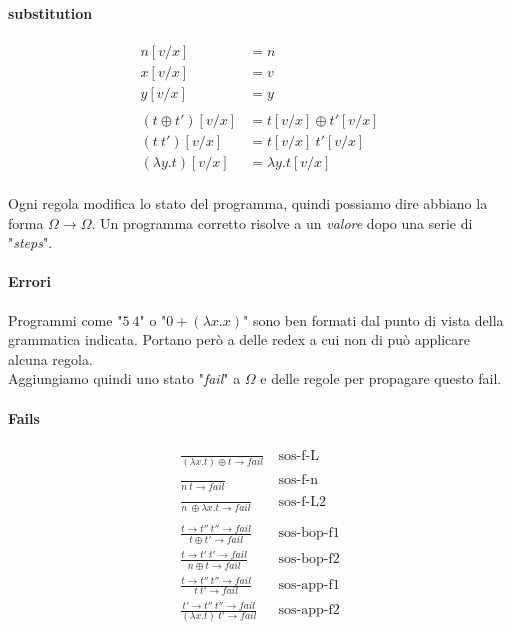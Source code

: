 \documentclass{article}
\begin{document}
\paragraph{substitution}
\begin{align*}
    n[v/x] &= n \\
    x[v/x] &= v \\
    y[v/x] &= y \\
    \\
    (t\oplus t')[v/x] &= t[v/x]\oplus t'[v/x] \\
    (t\ t')[v/x]  &= t[v/x]\ t'[v/x] \\
    (\lambda y.t)[v/x] &= \lambda y.t[v/x] \\
\end{align*}

Ogni regola modifica lo stato del programma, quindi possiamo dire abbiano la forma $\Omega \to \Omega$. 
Un programma corretto risolve a un \textit{valore} dopo una serie di "\textit{steps}".

\paragraph{Errori}
Programmi come "$5\ 4$" o "$0 + (\lambda x.x)$" sono ben formati dal punto di vista della grammatica indicata. Portano però a delle redex a cui non di può applicare alcuna regola. \\
Aggiungiamo quindi uno stato "\textit{fail}" a $\Omega$ e delle regole per propagare questo fail.

\paragraph{Fails}
\begin{align*}
    \frac{}{(\lambda x.t)\oplus t\to fail}\ &\text{sos-f-L} \\
    \frac{}{n\ t\to fail}\ &\text{sos-f-n} \\
    \frac{}{n\ \oplus \lambda x.t\to fail}\ &\text{sos-f-L2} \\
    \\
    \frac{t\to t'' \  t''\to fail}{t\oplus t' \to fail}\ &\text{sos-bop-f1} \\
    \frac{t\to t'\ t'\to fail}{n\oplus t \to fail}\ &\text{sos-bop-f2} \\
    \frac{t\to t'' \ t''\to fail}{t\ t' \to fail}\ &\text{sos-app-f1} \\
    \frac{t'\to t''\ t''\to fail}{(\lambda x.t)\ t'\to fail}\ &\text{sos-app-f2} \\
\end{align*}
\end{document}
